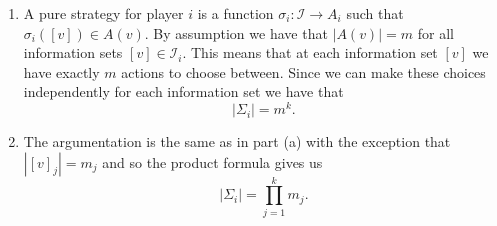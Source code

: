 \documentclass[a4paper]{article}
\begin{document}
\begin{exercise}{2}
  \begin{enumerate}[label=(\alph*)]
    \item A pure strategy for player $ i $ is a function $ \sigma_i: \mathcal{I} \to A_i $ such that $ \sigma_i([v]) \in A(v) $. By assumption we have that $ |A(v)| = m $ for all information sets $ [v] \in \mathcal{I}_i $. This means that at each information set $ [v] $ we have exactly $ m $ actions to choose between. Since we can make these choices independently for each information set we have that
      \begin{equation*}
        |\Sigma_i| = m^{k}.
      \end{equation*}

    \item The argumentation is the same as in part (a) with the exception that $ |[v]_j| = m_j $ and so the product formula gives us
      \begin{equation*}
        |\Sigma_i| = \prod_{j = 1}^{k} m_j
      .\end{equation*}
  \end{enumerate}
\end{exercise}
\end{document}
